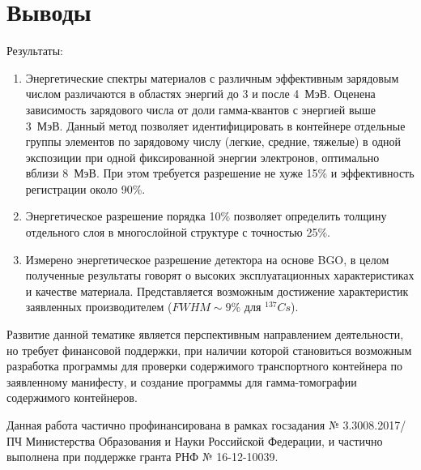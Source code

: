 \documentclass[a4paper]{panl}
\begin{document}
\section*{Выводы}
Результаты:   
    \begin{enumerate}
        \item Энергетические спектры материалов с различным эффективным зарядовым числом различаются в областях энергий до 3 и после 4~МэВ. Оценена зависимость зарядового числа от доли гамма-квантов с энергией выше 3~МэВ. Данный метод позволяет идентифицировать в контейнере отдельные группы элементов по зарядовому числу (легкие, средние, тяжелые) в одной экспозиции при одной фиксированной энергии электронов, оптимально вблизи 8~МэВ. При этом требуется разрешение не хуже 15\% и эффективность регистрации около 90\%. 
        \item Энергетическое разрешение порядка 10\% позволяет определить толщину отдельного слоя в многослойной структуре с точностью 25\%.
        \item Измерено энергетическое разрешение детектора на основе BGO, в целом полученные результаты говорят о высоких эксплуатационных характеристиках и качестве материала. Представляется возможным достижение характеристик заявленных производителем ($FWHM \sim 9\%$ для $^{137}Cs$).
    \end{enumerate}

Развитие данной тематике является перспективным направлением деятельности, но требует финансовой поддержки, при наличии которой становиться возможным разработка программы для проверки содержимого транспортного контейнера по заявленному манифесту, и создание программы для гамма-томографии содержимого контейнеров.

Данная работа частично профинансирована в рамках госзадания № 3.3008.2017/ПЧ Министерства Образования и Науки Российской Федерации, и частично выполнена при поддержке гранта РНФ № 16-12-10039.


\end{document}
